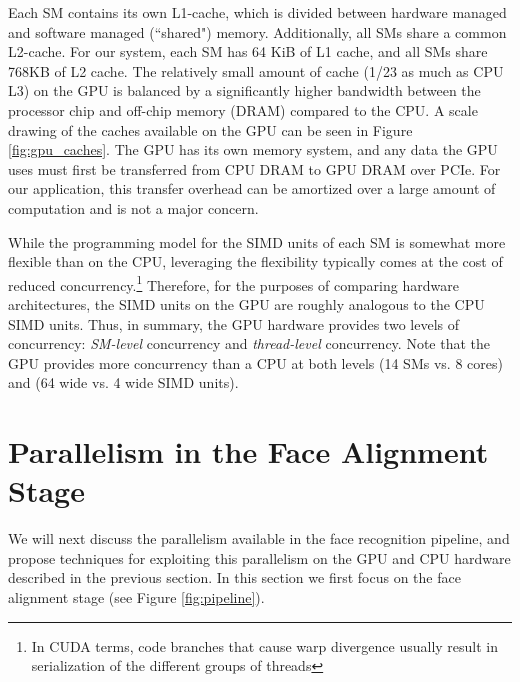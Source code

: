 \documentclass[preprint]{sigplanconf}
\begin{document}
Each SM contains its own L1-cache, which is divided between hardware managed
and software managed (``shared") memory.  Additionally, all SMs share a common
L2-cache.  For our system, each SM has 64 KiB of L1 cache, and all SMs share
768KB of L2 cache. 
The relatively small amount
of cache (1/23 as much as CPU L3) on the GPU is balanced by a significantly
higher bandwidth between the processor chip and off-chip memory (DRAM) compared
to the CPU.  A scale drawing of the caches available on the GPU can be seen in Figure \ref{fig:gpu_caches}.
The GPU has its own memory system, and any data the GPU uses must first be
transferred from CPU DRAM to GPU DRAM over PCIe.  For our application,
this transfer overhead can be amortized over a large amount of computation and is
not a major concern.

While the programming model for
the SIMD units of each SM is somewhat more flexible than on the CPU,
leveraging the flexibility typically comes at the cost of reduced concurrency.\footnote{
In CUDA terms, code branches that cause warp divergence usually
result in serialization of the different groups of threads}  Therefore, for
the purposes of comparing hardware architectures, the SIMD units on the GPU are
roughly analogous to the CPU SIMD units. Thus, in summary, the GPU hardware 
provides two levels of concurrency: {\em SM-level}
concurrency and {\em thread-level} concurrency.  Note that the GPU provides more
concurrency than a CPU at both levels (14 SMs vs. 8 cores) and (64 wide vs. 4 wide SIMD
units).


\section{Parallelism in the Face Alignment Stage}\vspace{-0.06in}
\label{sec:alignment}

We will next discuss the parallelism available in the face recognition
pipeline, and propose techniques for exploiting this parallelism on the GPU and CPU hardware 
described in the previous section.  In this section we first focus on the
face alignment stage (see Figure \ref{fig:pipeline}).
\end{document}
